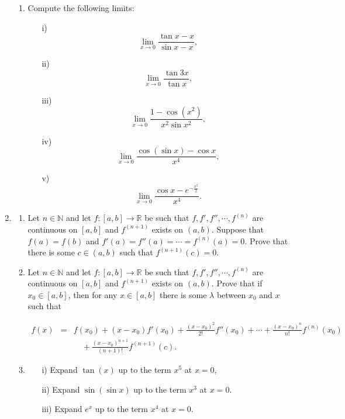 \documentclass[11pt]{article}
\newcommand{\bbN}{\mathbb{N}}
\newcommand{\bbR}{\mathbb{R}}
\renewcommand{\_}[1]{\underline{ #1 }}
\theoremstyle{definition}
\numberwithin{equation}{subsection}
\begin{document}
\begin{enumerate}
\begin{enumerate}
\item Compute  the following limits:
\begin{enumerate}
\item[i)] \[ \lim_{x\to0} \dfrac{\tan{x}-x}{\sin{x}-x},\]

\item[ii)] \[ \lim_{x\to0} \dfrac{\tan{3x}}{\tan{x}},\]

\item[iii)] \[ \lim_{x\to0} \dfrac{1-\cos(x^2)}{x^2\sin{x^2}},\]

\item[iv)] \[ \lim_{x\to0} \dfrac{\cos(\sin{x})-\cos{x}}{x^4},\]

\item[v)] \[ \lim_{x\to0} \dfrac{\cos{x}-e^{-\frac{x^2}{2}}}{x^4}.\]
\end{enumerate}

\end{enumerate}


\item 
\begin{enumerate}
\item Let $n\in\bbN$ and let $f\colon [a,b]\to\bbR$ be such that $f,f',f'',\cdots, f^{(n)}$ are continuous on $[a,b]$ and $f^{(n+1)}$ exists on $(a,b).$ Suppose that $f(a)=f(b)$ and $f'(a)=f''(a)=\cdots =f^{(n)}(a)=0.$ Prove that there is some $c\in (a,b)$ such that $f^{(n+1)}(c)=0.$


\item Let $n\in\bbN$ and let $f\colon [a,b]\to\bbR$ be such that $f,f',f'',\cdots, f^{(n)}$ are continuous on $[a,b]$ and $f^{(n+1)}$ exists on $(a,b).$ Prove that if $x_0\in [a,b]$, then for any  $x\in [a,b]$ there is some $\lambda $ between $x_0$ and $x$ such that

\begin{eqnarray*}
f(x) &  = &   f(x_0)+(x-x_0)f'(x_0)+\frac{(x-x_0)^2}{2!} f''(x_0)+\cdots+\frac{(x-x_0)^n}{n!} f^{(n)}(x_0) \\
& & \quad +\frac{(x-x_0)^{n+1}}{(n+1)!}        f^{(n+1)}(c).
\end{eqnarray*}


\item 
\begin{enumerate}
\item[i)] Expand $\tan(x)$ up to the term $x^5$ at $x=0$,
\item[ii)] Expand $\sin{(\sin{x})}$ up to the term $x^3$ at $x=0$.
\item[iii)] Expand $e^x$ up to the term $x^4$ at $x=0.$
\end{enumerate}
\end{enumerate}



\end{enumerate}
\end{document}
